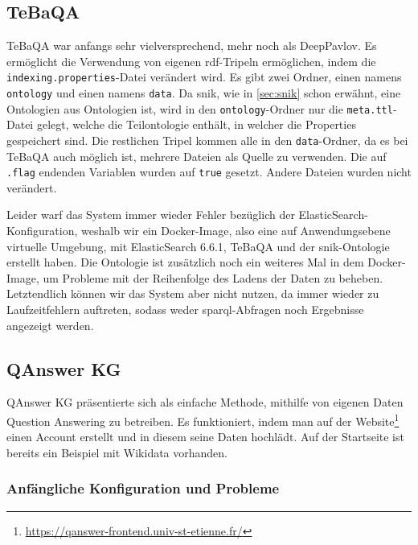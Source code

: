 \subsection{TeBaQA}

TeBaQA war anfangs sehr vielversprechend, mehr noch als DeepPavlov.
Es ermöglicht die Verwendung von eigenen \ac{rdf}-Tripeln ermöglichen, indem die \texttt{indexing.properties}-Datei verändert wird.
Es gibt zwei Ordner, einen namens \texttt{ontology} und einen namens \texttt{data}.
Da \ac{snik}, wie in \cref{sec:snik} schon erwähnt, eine Ontologien aus Ontologien ist, wird in den \texttt{ontology}-Ordner nur die \texttt{meta.ttl}-Datei gelegt,
welche die Teilontologie enthält, in welcher die Properties gespeichert sind.
Die restlichen Tripel kommen alle in den \texttt{data}-Ordner, da es bei TeBaQA auch möglich ist, mehrere Dateien als Quelle zu verwenden.
Die auf \texttt{.flag} endenden Variablen wurden auf \texttt{true} gesetzt.
Andere Dateien wurden nicht verändert.

Leider warf das System immer wieder Fehler bezüglich der ElasticSearch-Konfiguration, weshalb wir ein Docker-Image,
also eine auf Anwendungsebene virtuelle Umgebung, mit ElasticSearch 6.6.1, TeBaQA und der \ac{snik}-Ontologie erstellt haben.
Die Ontologie ist zusätzlich noch ein weiteres Mal in dem Docker-Image, um Probleme mit der Reihenfolge des Ladens der Daten zu beheben.
Letztendlich können wir das System aber nicht nutzen, da immer wieder zu Laufzeitfehlern auftreten,
sodass weder \ac{sparql}-Abfragen noch Ergebnisse angezeigt werden.

\subsection{QAnswer KG}

QAnswer KG präsentierte sich als einfache Methode, mithilfe von eigenen Daten Question Answering zu betreiben.
Es funktioniert, indem man auf der Website\footnote{\url{https://qanswer-frontend.univ-st-etienne.fr/}} einen Account erstellt und in diesem seine Daten hochlädt.
Auf der Startseite ist bereits ein Beispiel mit Wikidata vorhanden.

\subsubsection{Anfängliche Konfiguration und Probleme}

